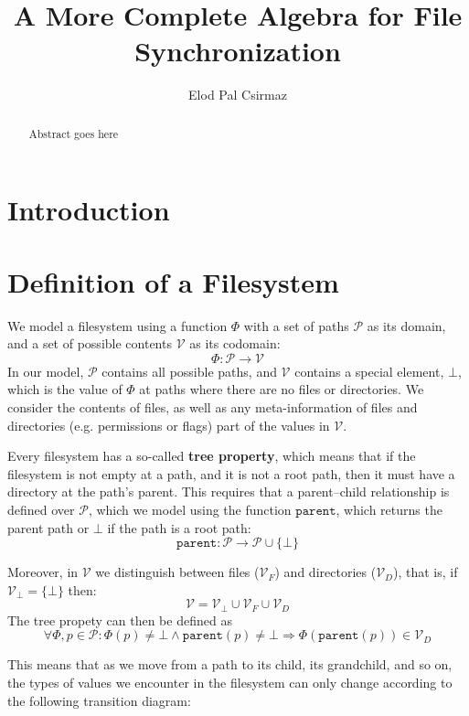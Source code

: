 \documentclass[12pt]{article}
\title{A More Complete Algebra for File Synchronization}
\author{Elod Pal Csirmaz}
\newcommand{\setv}{\mathcal{V}}
\newcommand{\setvx}[1]{\mathcal{V}_{#1}}
\newcommand{\setf}{\setvx{F}}
\newcommand{\setd}{\setvx{D}}
\newcommand{\setb}{\setvx{\empt}}
\newcommand{\setp}{\mathcal{P}}
\newcommand{\empt}{\bot}
\newcommand{\parent}{\mathtt{parent}}
\newcommand{\FS}{\Phi} %
\begin{document}
\maketitle
\begin{abstract}
Abstract goes here
\end{abstract}

\section{Introduction}


\section{Definition of a Filesystem}

We model a filesystem using a function $\FS$ with a set of paths $\setp$ as its domain,
and a set of possible contents $\setv$ as its codomain:
\[ \FS : \setp \rightarrow \setv \] 
In our model, $\setp$ contains all possible paths, and $\setv$ contains a special
element, $\empt$, which is the value of $\FS$ at paths where there are no files
or directories.
We consider the contents of files, as well as any meta-information of files
and directories (e.g. permissions or flags) part of the values in $\setv$.

Every filesystem has a so-called \textbf{tree property}, which means that
if the filesystem is not empty at a path, and it is not a root path,
then it must have a directory at the path's parent.
This requires that a parent--child relationship is defined over $\setp$,
which we model using the function $\parent$, which returns the parent path
or $\empt$ if the path is a root path:
\[ \parent : \setp \rightarrow \setp \cup \{\empt\} \]

Moreover, in $\setv$ we distinguish between files ($\setf$) and directories ($\setd$), that is,
if $\setb = \{\empt\}$ then:
\[ \setv = \setb \cup \setf \cup \setd \]
The tree propety can then be defined as
\[ \forall \FS, p\in\setp : \FS(p) \neq \empt \wedge \parent(p) \neq \empt \Rightarrow \FS(\parent(p)) \in \setd \]

This means that as we move from a path to its child, its grandchild, and so on,
the types of values we encounter in the filesystem can only change according to the following
transition diagram:
\end{document}
